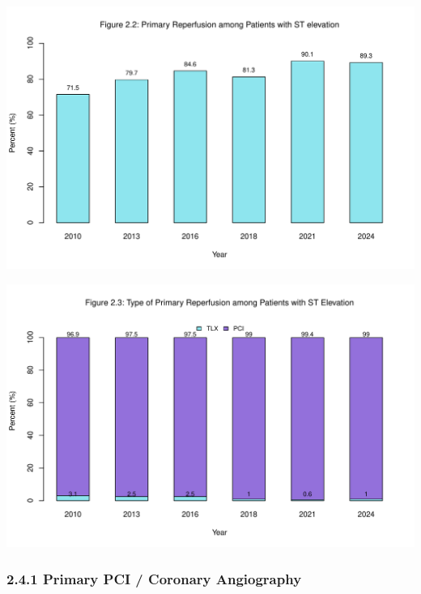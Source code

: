 \documentclass[
]{article}
\begin{document}
\includegraphics{‏‏ACSIS_2024_v1_with_trend_pdf_files/figure-latex/unnamed-chunk-123-1.pdf}

\includegraphics{‏‏ACSIS_2024_v1_with_trend_pdf_files/figure-latex/unnamed-chunk-124-1.pdf}

\pagebreak

\subsubsection{2.4.1 Primary PCI / Coronary
Angiography}\label{primary-pci-coronary-angiography-1}
\end{document}

